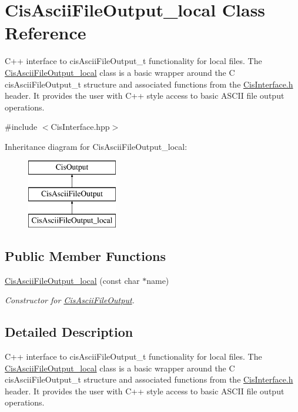 \hypertarget{classCisAsciiFileOutput__local}{}\section{Cis\+Ascii\+File\+Output\+\_\+local Class Reference}
\label{classCisAsciiFileOutput__local}


C++ interface to cis\+Ascii\+File\+Output\+\_\+t functionality for local files. The \mbox{\hyperlink{classCisAsciiFileOutput__local}{Cis\+Ascii\+File\+Output\+\_\+local}} class is a basic wrapper around the C cis\+Ascii\+File\+Output\+\_\+t structure and associated functions from the \mbox{\hyperlink{CisInterface_8h_source}{Cis\+Interface.\+h}} header. It provides the user with C++ style access to basic A\+S\+C\+II file output operations.  




{\ttfamily \#include $<$Cis\+Interface.\+hpp$>$}

Inheritance diagram for Cis\+Ascii\+File\+Output\+\_\+local\+:\begin{figure}[H]
\begin{center}
\leavevmode
\includegraphics[height=3.000000cm]{classCisAsciiFileOutput__local}
\end{center}
\end{figure}
\subsection*{Public Member Functions}
\begin{DoxyCompactItemize}
\item 
\mbox{\hyperlink{classCisAsciiFileOutput__local_a879ac5cab1e7f7b8625cef59e239db91}{Cis\+Ascii\+File\+Output\+\_\+local}} (const char $\ast$name)
\begin{DoxyCompactList}\small\item\em Constructor for \mbox{\hyperlink{classCisAsciiFileOutput}{Cis\+Ascii\+File\+Output}}. \end{DoxyCompactList}\end{DoxyCompactItemize}


\subsection{Detailed Description}
C++ interface to cis\+Ascii\+File\+Output\+\_\+t functionality for local files. The \mbox{\hyperlink{classCisAsciiFileOutput__local}{Cis\+Ascii\+File\+Output\+\_\+local}} class is a basic wrapper around the C cis\+Ascii\+File\+Output\+\_\+t structure and associated functions from the \mbox{\hyperlink{CisInterface_8h_source}{Cis\+Interface.\+h}} header. It provides the user with C++ style access to basic A\+S\+C\+II file output operations. 

